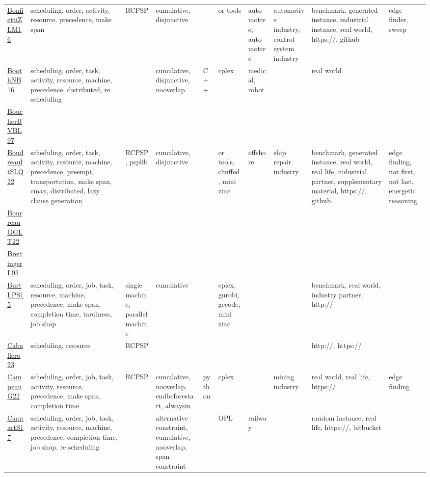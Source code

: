 {\begin{longtable}{p{3cm}p{4cm}p{2cm}p{2cm}p{2cm}p{2cm}p{2cm}p{2cm}p{2cm}p{2cm}}
\href{papers/BonfiettiZLM16.pdf}{BonfiettiZLM16}~\cite{BonfiettiZLM16} & scheduling, order, activity, resource, precedence, make span & RCPSP & cumulative, disjunctive &  & or tools & automotive, automotive & automotive industry, control system industry & benchmark, generated instance, industrial instance, real world, https://, github & edge finder, sweep\\
\href{papers/BoothNB16.pdf}{BoothNB16}~\cite{BoothNB16} & scheduling, order, task, activity, resource, machine, precedence, distributed, re scheduling &  & cumulative, disjunctive, nooverlap &  C++  & cplex & medical, robot &  & real world & \\
\href{papers/BoucherBVBL97.pdf}{BoucherBVBL97}~\cite{BoucherBVBL97} &  &  &  &  &  &  &  &  & \\
\href{papers/BoudreaultSLQ22.pdf}{BoudreaultSLQ22}~\cite{BoudreaultSLQ22} & scheduling, order, task, activity, resource, machine, precedence, preempt, transportation, make span, cmax, distributed, lazy clause generation & RCPSP, psplib & cumulative, disjunctive &  & or tools, chuffed, mini zinc & offshore & ship repair industry & benchmark, generated instance, real world, real life, industrial partner, supplementary material, https://, github & edge finding, not first, not last, energetic reasoning\\
\href{articles/BourreauGGLT22.pdf}{BourreauGGLT22}~\cite{BourreauGGLT22} &  &  &  &  &  &  &  &  & \\
\href{}{BreitingerL95}~\cite{BreitingerL95} &  &  &  &  &  &  &  &  & \\
\href{papers/BurtLPS15.pdf}{BurtLPS15}~\cite{BurtLPS15} & scheduling, order, job, task, resource, machine, precedence, make span, completion time, tardiness, job shop & single machine, parallel machine & cumulative &  & cplex, gurobi, gecode, mini zinc &  &  & benchmark, real world, industry partner, http:// & \\
\href{articles/Caballero23.pdf}{Caballero23}~\cite{Caballero23} & scheduling, resource & RCPSP &  &  &  &  &  & http://, https:// & \\
\href{articles/CampeauG22.pdf}{CampeauG22}~\cite{CampeauG22} & scheduling, order, job, task, activity, resource, precedence, make span, completion time & RCPSP & cumulative, nooverlap, endbeforestart, alwaysin & python & cplex &  & mining industry & real world, real life, https:// & edge finding\\
\href{papers/CappartS17.pdf}{CappartS17}~\cite{CappartS17} & scheduling, order, job, task, activity, resource, machine, precedence, completion time, job shop, re scheduling &  & alternative constraint, cumulative, nooverlap, span constraint &  & OPL & railway &  & random instance, real life, https://, bitbucket & \\

\end{longtable}}
